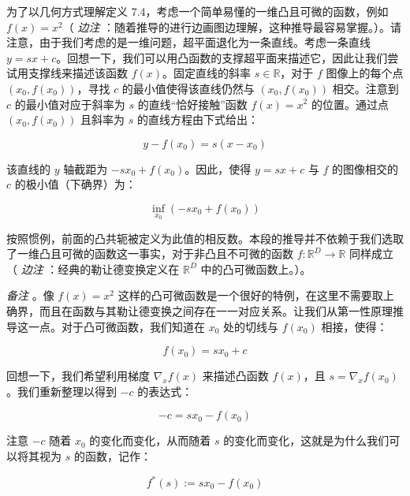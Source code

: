 为了以几何方式理解定义 7.4，考虑一个简单易懂的一维凸且可微的函数，例如 $ f(x) = x^2 $（ \emph{边注} ：随着推导的进行边画图边理解，这种推导最容易掌握。）。请注意，由于我们考虑的是一维问题，超平面退化为一条直线。考虑一条直线 $ y = sx + c $。回想一下，我们可以用凸函数的支撑超平面来描述它，因此让我们尝试用支撑线来描述该函数 $ f(x) $。固定直线的斜率 $ s \in \mathbb{R} $，对于 $ f $ 图像上的每个点 $ (x_0, f(x_0)) $，寻找 $ c $ 的最小值使得该直线仍然与 $ (x_0, f(x_0)) $ 相交。注意到 $ c $ 的最小值对应于斜率为 $ s $ 的直线“恰好接触”函数 $ f(x) = x^2 $ 的位置。通过点 $ (x_0, f(x_0)) $ 且斜率为 $ s $ 的直线方程由下式给出：

\begin{equation}
y - f(x_0) = s(x - x_0)
\tag{7.54}\label{eq:7-54}
\end{equation}

该直线的 $ y $ 轴截距为 $ -sx_0 + f(x_0) $。因此，使得 $ y = sx + c $ 与 $ f $ 的图像相交的 $ c $ 的极小值（下确界）为：

\begin{equation}
\inf_{x_0} \left( -sx_0 + f(x_0) \right)
\tag{7.55}\label{eq:7-55}
\end{equation}

按照惯例，前面的凸共轭被定义为此值的相反数。本段的推导并不依赖于我们选取了一维凸且可微的函数这一事实，对于非凸且不可微的函数 $ f : \mathbb{R}^D \to \mathbb{R} $ 同样成立（ \emph{边注} ：经典的勒让德变换定义在 $ \mathbb{R}^D $ 中的凸可微函数上。）。

\emph{备注} 。像 $ f(x) = x^2 $ 这样的凸可微函数是一个很好的特例，在这里不需要取上确界，而且在函数与其勒让德变换之间存在一一对应关系。让我们从第一性原理推导这一点。对于凸可微函数，我们知道在 $ x_0 $ 处的切线与 $ f(x_0) $ 相接，使得：

\begin{equation}
f(x_0) = sx_0 + c
\tag{7.56}\label{eq:7-56}
\end{equation}

回想一下，我们希望利用梯度 $ \nabla_x f(x) $ 来描述凸函数 $ f(x) $，且 $ s = \nabla_x f(x_0) $。我们重新整理以得到 $ -c $ 的表达式：

\begin{equation}
-c = sx_0 - f(x_0)
\tag{7.57}\label{eq:7-57}
\end{equation}

注意 $ -c $ 随着 $ x_0 $ 的变化而变化，从而随着 $ s $ 的变化而变化，这就是为什么我们可以将其视为 $ s $ 的函数，记作：

\begin{equation}
f^*(s) := sx_0 - f(x_0)
\tag{7.58}\label{eq:7-58}
\end{equation}

